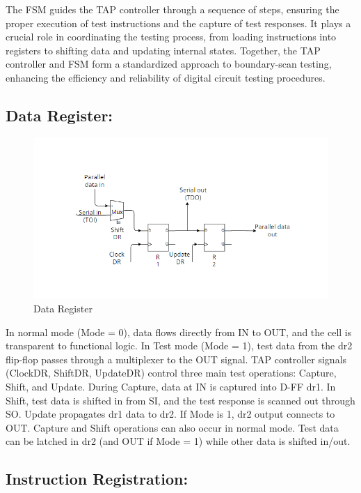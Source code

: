 The FSM guides the TAP controller through a sequence of steps, ensuring the proper execution of test instructions and the capture of test responses. It plays a crucial role in coordinating the testing process, from loading instructions into registers to shifting data and updating internal states. Together, the TAP controller and FSM form a standardized approach to boundary-scan testing, enhancing the efficiency and reliability of digital circuit testing procedures.
\vspace{3mm}

\newpage
\subsection{\textbf{Data Register:}}
\begin{figure}[h]
    \centering
    \includegraphics[width=1\linewidth]{Image/dataregister.png}
    \caption{Data Register}
    \label{fig:enter-label}
\end{figure}
In normal mode (Mode = 0), data flows directly from IN to OUT, and the cell is transparent to functional logic. In Test mode (Mode = 1), test data from the dr2 flip-flop passes through a multiplexer to the OUT signal. TAP controller signals (ClockDR, ShiftDR, UpdateDR) control three main test operations: Capture, Shift, and Update. During Capture, data at IN is captured into D-FF dr1. In Shift, test data is shifted in from SI, and the test response is scanned out through SO. Update propagates dr1 data to dr2. If Mode is 1, dr2 output connects to OUT. Capture and Shift operations can also occur in normal mode. Test data can be latched in dr2 (and OUT if Mode = 1) while other data is shifted in/out.
\vspace{3mm}

\subsection{\textbf{Instruction Registration:}}

